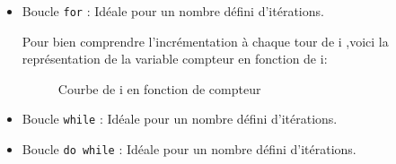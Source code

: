 \begin{itemize}
	\item Boucle \lstinline|for| : Idéale pour un nombre défini d'itérations.
	
	
	
	Pour bien comprendre l'incrémentation à chaque tour de i ,voici la représentation de la variable compteur en fonction de i:
	
	\begin{figure}[ht]
	\centering
	\caption{Courbe de i en fonction de compteur}
	\end{figure}
	
	
	\item Boucle \lstinline|while| : Idéale pour un nombre défini d'itérations.
	
	
	
	\item Boucle \lstinline|do while| : Idéale pour un nombre défini d'itérations.
	
	
\end{itemize}